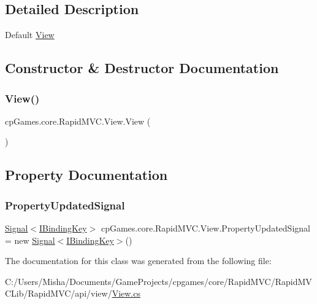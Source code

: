 \subsection{Detailed Description}
Default \mbox{\hyperlink{classcp_games_1_1core_1_1_rapid_m_v_c_1_1_view}{View}} 



\subsection{Constructor \& Destructor Documentation}
\mbox{\label{classcp_games_1_1core_1_1_rapid_m_v_c_1_1_view_a40db8f93a7952a91c90183ded2f44640}} 
\subsubsection{\texorpdfstring{View()}{View()}}
{\footnotesize\ttfamily cp\+Games.\+core.\+Rapid\+M\+V\+C.\+View.\+View (\begin{DoxyParamCaption}{ }\end{DoxyParamCaption})\hspace{0.3cm}{\ttfamily [protected]}}



\subsection{Property Documentation}
\mbox{\label{classcp_games_1_1core_1_1_rapid_m_v_c_1_1_view_ab8e01d990df4516ff4591df6277edf63}} 
\subsubsection{\texorpdfstring{PropertyUpdatedSignal}{PropertyUpdatedSignal}}
{\footnotesize\ttfamily \mbox{\hyperlink{classcp_games_1_1core_1_1_rapid_m_v_c_1_1_signal}{Signal}}$<$\mbox{\hyperlink{interfacecp_games_1_1core_1_1_rapid_m_v_c_1_1_i_binding_key}{I\+Binding\+Key}}$>$ cp\+Games.\+core.\+Rapid\+M\+V\+C.\+View.\+Property\+Updated\+Signal = new \mbox{\hyperlink{classcp_games_1_1core_1_1_rapid_m_v_c_1_1_signal}{Signal}}$<$\mbox{\hyperlink{interfacecp_games_1_1core_1_1_rapid_m_v_c_1_1_i_binding_key}{I\+Binding\+Key}}$>$()\hspace{0.3cm}{\ttfamily [get]}}



The documentation for this class was generated from the following file\+:\begin{DoxyCompactItemize}
\item 
C\+:/\+Users/\+Misha/\+Documents/\+Game\+Projects/cpgames/core/\+Rapid\+M\+V\+C/\+Rapid\+M\+V\+C\+Lib/\+Rapid\+M\+V\+C/api/view/\mbox{\hyperlink{_view_8cs}{View.\+cs}}\end{DoxyCompactItemize}
